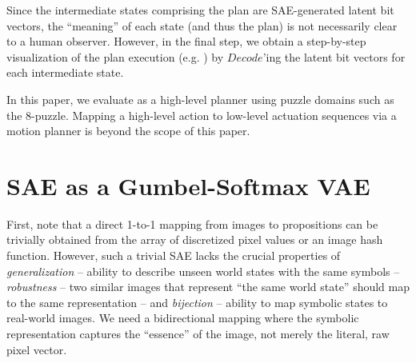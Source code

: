 \documentclass[11pt]{article}
\begin{document}
Since the intermediate states comprising the plan are SAE-generated latent bit vectors, the ``meaning'' of each state (and thus the plan) is not necessarily clear to a human observer.
However, in the final step, we obtain a step-by-step visualization of the plan execution (e.g. )
by $Decode$'ing the latent bit vectors for each intermediate state.

In this paper, we evaluate \latentplanner as a high-level planner using puzzle domains such as the 8-puzzle.
Mapping a high-level action to low-level actuation sequences via a motion planner is beyond the scope of this paper.


\section{SAE as a Gumbel-Softmax VAE}
\label{sec:state-autoencoder}

First, note that a direct 1-to-1 mapping from images to propositions can be trivially obtained from
the array of discretized pixel values or an image hash function.
However, such a trivial SAE lacks the crucial properties of
\emph{generalization} -- ability to describe unseen world states with the same symbols --
\emph{robustness} -- two similar images that represent ``the same world state'' should map to the same representation --
and \emph{bijection} -- ability to map symbolic states to real-world images.
We need a bidirectional mapping where the symbolic representation captures the ``essence'' of the image, not merely the literal, raw pixel vector.
\end{document}
